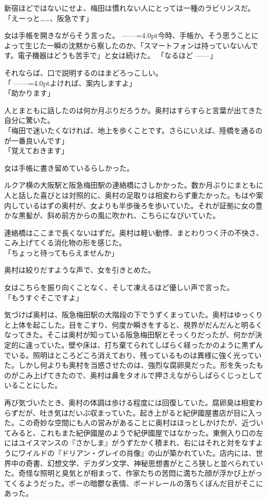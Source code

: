 \documentclass[b5j,twoside,twocolumn]{utarticle}
\begin{document}
新宿ほどではないにせよ、梅田は慣れない人にとっては一種のラビリンスだ。\\
「えーっと……、阪急です」　


女は手帳を開きながらそう言った。\tbaselineshift =2.5pt ------\tbaselineshift =4.0pt今時、手帳か。そう思うことによって生じた一瞬の沈黙から察したのか、「スマートフォンは持っていないんです。電子機器はどうも苦手で」と女は続けた。
「なるほど\tbaselineshift =2.5pt ------\tbaselineshift =4.0pt」


それならば、口で説明するのはまどろっこしい。\\
「\tbaselineshift =2.5pt ------\tbaselineshift =4.0ptよければ、案内しますよ」\\
「助かります」


人とまともに話したのは何か月ぶりだろうか。奥村はすらすらと言葉が出てきた自分に驚いた。\\
「梅田で迷いたくなければ、地上を歩くことです。さらにいえば、陸橋を通るのが一番良いんです」\\
「覚えておきます」


女は手帳に書き留めているらしかった。


ルクア横の大阪駅と阪急梅田駅の連絡橋にさしかかった。数か月ぶりにまともに人と話した喜びとは対照的に、奥村の足取りは相変わらず重たかった。もはや案内しているはずの奥村が、女よりも半歩後ろを歩いていた。それが証拠に女の豊かな黒髪が、斜め前方からの風に吹かれ、こちらになびいていた。


連絡橋はここまで長くないはずだ。奥村は軽い動悸、まとわりつく汗の不快さ、こみ上げてくる消化物の形を感じた。\\
「ちょっと待ってもらえませんか」


奥村は絞りだすような声で、女を引きとめた。


女はこちらを振り向くことなく、そして凍えるほど優しい声で言った。\\
「もうすぐそこですよ」


気づけば奥村は、阪急梅田駅の大階段の下でうずくまっていた。奥村はゆっくりと上体を起こした。目をこすり、何度か瞬きをすると、視界がだんだんと明るくなってきた。そこは奥村が知っている阪急梅田駅とそっくりだったが、何かが決定的に違っていた。壁や床は、打ち棄てられてしばらく経ったかのように黒ずんでいる。照明はところどころ消えており、残っているものは異様に強く光っていた。しかし何よりも奥村を当惑させたのは、強烈な腐卵臭だった。形を失ったものがこみ上げてきたので、奥村は鼻をタオルで押さえながらしばらくじっとしていることにした。


再び気づいたとき、奥村の体調は歩ける程度には回復していた。腐卵臭は相変わらずだが、吐き気はだいぶ収まっていた。起き上がると紀伊國屋書店が目に入った。この奇妙な空間にも人の営みがあることに奥村はほっとしかけたが、近づいてみると、これもまた紀伊國屋のようで紀伊國屋ではなかった。東側入り口の左にはユイスマンスの『さかしま』がうずたかく積まれ、右にはそれと対をなすようにワイルドの『ドリアン・グレイの肖像』の山が築かれていた。店内には、世界中の奇書、幻想文学、デカダン文学、神秘思想書がところ狭しと並べられていた。奇怪な照明と臭気とが相まって、作家たちの苦悶に満ちた顔が浮かび上がってくるようだった。ポーの暗鬱な表情、ボードレールの落ちくぼんだ目がそこにあった。
\end{document}
